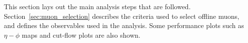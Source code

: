 This section lays out the main analysis steps that are followed.
Section~\ref{sec:muon_selection} describes the criteria used to
  select offline muons, and defines the observables used in the analysis.
Some performance plots such as $\eta-\phi$ maps and cut-flow plots are also shown.
